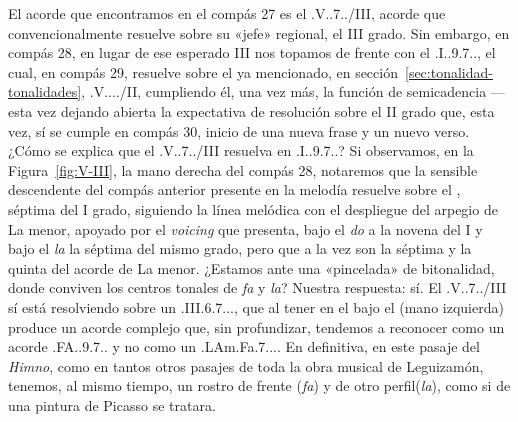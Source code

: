 El acorde que encontramos en el compás 27 es el \acorde.V..7../III, acorde que convencionalmente resuelve sobre su «jefe» regional, el III grado. Sin embargo, en compás 28, en lugar de ese esperado III nos topamos de frente con el \acorde.I..9.7.., el cual, en compás 29, resuelve sobre el ya mencionado, en sección~\ref{sec:tonalidad-tonalidades}, \acorde.V..../II, cumpliendo él, una vez más, la función de semicadencia ---esta vez dejando abierta la expectativa de resolución sobre el II grado que, esta vez, sí se cumple en compás 30, inicio de una nueva frase y un nuevo verso. ¿Cómo se explica que el \acorde.V..7../III resuelva en \acorde.I..9.7..? Si observamos, en la Figura~\ref{fig:V-III}, la mano derecha del compás 28, notaremos que la sensible descendente  del compás anterior presente en la melodía resuelve sobre el , séptima del I grado, siguiendo la línea melódica con el despliegue del arpegio de La menor, apoyado por el \emph{voicing} que presenta, bajo el \emph{do} a la novena del I y bajo el \emph{la} la séptima del mismo grado, pero que a la vez son la séptima y la quinta del acorde de La menor. ¿Estamos ante una «pincelada» de bitonalidad, donde conviven los centros tonales de \emph{fa} y \emph{la}? Nuestra respuesta: sí. El \acorde.V..7../III sí está resolviendo sobre un \acorde.III.6.7..., que al tener en el bajo el  (mano izquierda) produce un acorde complejo que, sin profundizar, tendemos a reconocer como un acorde \acorde.FA..9.7.. y no como un \acorde.LAm.Fa.7.... En definitiva, en este pasaje del \emph{Himno}, como en tantos otros pasajes de toda la obra musical de Leguizamón, tenemos, al mismo tiempo, un rostro de frente (\emph{fa}) y de otro perfil(\emph{la}), como si de una pintura de Picasso se tratara.
